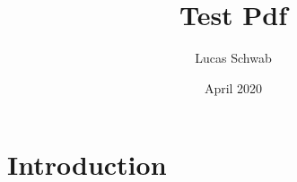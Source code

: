 \documentclass{article}
\title{Test Pdf}
\author{Lucas Schwab}
\date{April 2020}
\begin{document}
\maketitle

\section{Introduction}
\end{document}
